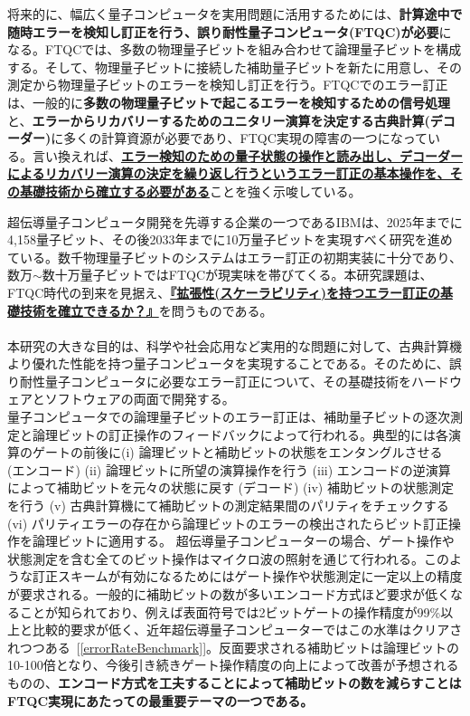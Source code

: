 \documentclass[11pt,a4j,dvipdfmx]{jarticle} 					%
\newcommand{\研究課題名}{誤り耐性量子コンピュータに向けた誤り訂正技術の開発(仮)}
\newcommand{\研究機関名}{東京大学}
\newcommand{\研究代表者氏名}{寺師弘二}
\newcommand{\研究期間の最終元号年度}{10}  %
\newcommand{\mybf}[1]{{\bfseries\sffamily#1}}
\begin{document}
将来的に、幅広く量子コンピュータを実用問題に活用するためには、\mybf{計算途中で随時エラーを検知し訂正を行う、誤り耐性量子コンピュータ(FTQC)が必要}になる。FTQCでは、多数の物理量子ビットを組み合わせて論理量子ビットを構成する。そして、物理量子ビットに接続した補助量子ビットを新たに用意し、その測定から物理量子ビットのエラーを検知し訂正を行う。FTQCでのエラー訂正は、一般的に\mybf{多数の物理量子ビットで起こるエラーを検知するための信号処理}と、\mybf{エラーからリカバリーするためのユニタリー演算を決定する古典計算(デコーダー)}に多くの計算資源が必要であり、FTQC実現の障害の一つになっている。言い換えれば、\mybf{\ul{エラー検知のための量子状態の操作と読み出し、デコーダーによるリカバリー演算の決定を繰り返し行うというエラー訂正の基本操作を、その基礎技術から確立する必要がある}}ことを強く示唆している。

超伝導量子コンピュータ開発を先導する企業の一つであるIBMは、2025年までに4,158量子ビット、その後2033年までに10万量子ビットを実現すべく研究を進めている。数千物理量子ビットのシステムはエラー訂正の初期実装に十分であり、数万$\sim$数十万量子ビットではFTQCが現実味を帯びてくる。本研究課題は、FTQC時代の到来を見据え、\mybf{\ul{『拡張性(スケーラビリティ)を持つエラー訂正の基礎技術を確立できるか？』}}を問うものである。\\

\\
本研究の大きな目的は、科学や社会応用など実用的な問題に対して、古典計算機より優れた性能を持つ量子コンピュータを実現することである。そのために、誤り耐性量子コンピュータに必要なエラー訂正について、その基礎技術をハードウェアとソフトウェアの両面で開発する。 \\

量子コンピュータでの論理量子ビットのエラー訂正は、補助量子ビットの逐次測定と論理ビットの訂正操作のフィードバックによって行われる。典型的には各演算のゲートの前後に(i) 論理ビットと補助ビットの状態をエンタングルさせる (エンコード) (ii) 論理ビットに所望の演算操作を行う (iii) エンコードの逆演算によって補助ビットを元々の状態に戻す (デコード) (iv) 補助ビットの状態測定を行う (v) 古典計算機にて補助ビットの測定結果間のパリティをチェックする (vi) パリティエラーの存在から論理ビットのエラーの検出されたらビット訂正操作を論理ビットに適用する。
%
超伝導量子コンピューターの場合、ゲート操作や状態測定を含む全てのビット操作はマイクロ波の照射を通じて行われる。このような訂正スキームが有効になるためにはゲート操作や状態測定に一定以上の精度が要求される。一般的に補助ビットの数が多いエンコード方式ほど要求が低くなることが知られており、例えば表面符号では2ビットゲートの操作精度が99\%以上と比較的要求が低く、近年超伝導量子コンピューターではこの水準はクリアされつつある~[\ref{errorRateBenchmark}]。反面要求される補助ビットは論理ビットの10-100倍となり、今後引き続きゲート操作精度の向上によって改善が予想されるものの、\mybf{エンコード方式を工夫することによって補助ビットの数を減らすことはFTQC実現にあたっての最重要テーマの一つである。} \\
\end{document}

